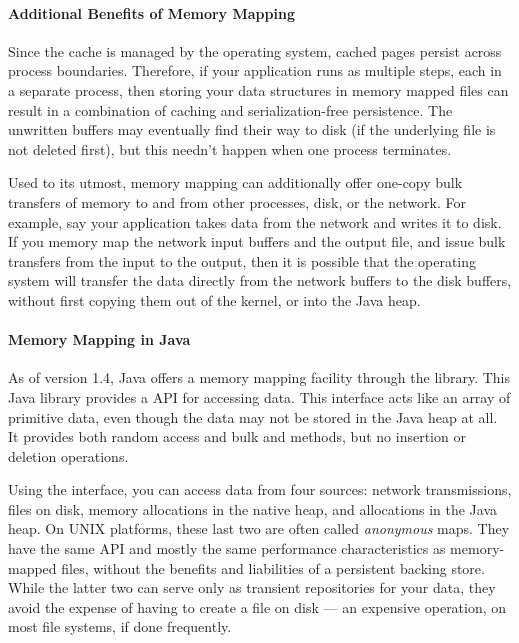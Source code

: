 \paragraph{Additional Benefits of Memory Mapping}
Since the cache is managed by the operating system, cached pages persist across
process boundaries. Therefore, if your application runs as multiple steps, each
in a separate process, then storing your data structures in memory mapped files
can result in a combination of caching and serialization-free persistence. The
unwritten buffers may eventually find their way to disk (if the underlying file
is not deleted first), but this needn't happen when one process terminates.

Used to its utmost, memory mapping can additionally offer one-copy bulk
transfers of memory to and from other processes, disk, or the network. For
example, say your application takes data from the network and writes it to
disk. If you memory map the network input buffers and the output file, and issue
bulk transfers from the input to the output, then it is possible that the
operating system will transfer the data directly from the network buffers to the
disk buffers, without first copying them out of the kernel, or into the
Java heap.

\paragraph{Memory Mapping in Java}
As of version 1.4, Java offers a memory mapping facility through the
 library. This Java library provides a  API for
accessing data. This interface acts like an array of primitive data, even though
the data may not be stored in the Java heap at all. It provides both random
access and bulk  and  methods, but no insertion or deletion
operations.

Using the  interface, you can access data from four sources:
network transmissions, files on disk, memory allocations in the native heap, and
allocations in the Java heap. On UNIX platforms, these last two are often called
\emph{anonymous} maps. They have the same API and mostly the same performance
characteristics as memory-mapped files, without the benefits and liabilities of
a persistent backing store. While the latter two can serve only as transient
repositories for your data, they avoid the expense of having to create a file on
disk --- an expensive operation, on most file systems, if done frequently.

